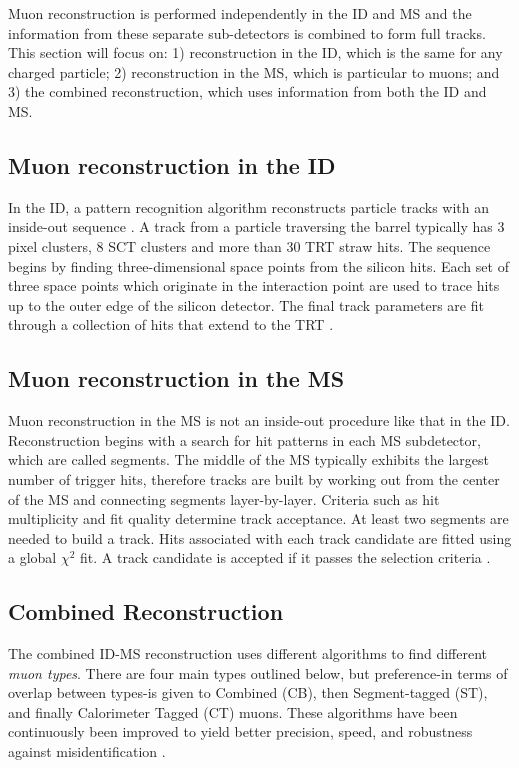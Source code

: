 Muon reconstruction is performed independently in the ID and MS and the information from these separate sub-detectors is combined to form full tracks. This section will focus on: 1) reconstruction in the ID, which is the same for any charged particle; 2) reconstruction in the MS, which is particular to muons; and 3) the combined reconstruction, which uses information from both the ID and MS. 

\subsection{Muon reconstruction in the ID}
In the ID, a pattern recognition algorithm reconstructs particle tracks with an inside-out sequence \cite{patternrecognition}. A track from a particle traversing the barrel typically has 3 pixel clusters, 8 SCT clusters and more than 30 TRT straw hits. The sequence begins by finding three-dimensional space points from the silicon hits. Each set of three space points which originate in the  interaction point are used to trace hits up to the outer edge of the silicon detector. The final track parameters are fit through a collection of hits that extend to the TRT \cite{IDreconstruction}.

\subsection{Muon reconstruction in the MS}
Muon reconstruction in the MS is not an inside-out procedure like that in the ID. Reconstruction begins with a search for hit patterns in each MS subdetector, which are called segments. The middle of the MS typically exhibits the largest number of trigger hits, therefore tracks are built by working out from the center of the MS and connecting segments layer-by-layer. Criteria such as hit multiplicity and fit quality determine track acceptance. At least two segments are needed to build a track. Hits associated with each track candidate are fitted using a global $\chi^2$ fit. A track candidate is accepted if it passes the selection criteria \cite{ICreconstruction}. 

\subsection{Combined Reconstruction}
The combined ID-MS reconstruction uses different algorithms to find different \textit{muon types}. There are four main types outlined below, but preference-in terms of overlap between types-is given to Combined (CB), then Segment-tagged (ST), and finally Calorimeter Tagged (CT) muons. These algorithms have been continuously been improved to yield better precision, speed, and robustness against misidentification \cite{MCPpaper}.  

